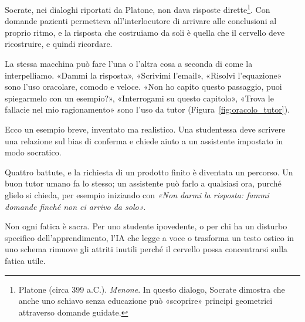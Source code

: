 Socrate, nei dialoghi riportati da Platone, non dava risposte dirette\footnote{Platone (circa 399 a.C.). \textit{Menone}. In questo dialogo, Socrate dimostra che anche uno schiavo senza educazione può «scoprire» principi geometrici attraverso domande guidate.}. Con domande pazienti permetteva all'interlocutore di arrivare alle conclusioni al proprio ritmo, e la risposta che costruiamo da soli è quella che il cervello deve ricostruire, e quindi ricordare.

La stessa macchina può fare l'una o l'altra cosa a seconda di come la interpelliamo. «Dammi la risposta», «Scrivimi l'email», «Risolvi l'equazione» sono l'uso oracolare, comodo e veloce. «Non ho capito questo passaggio, puoi spiegarmelo con un esempio?», «Interrogami su questo capitolo», «Trova le fallacie nel mio ragionamento» sono l'uso da tutor (Figura~\ref{fig:oracolo_tutor}).


Ecco un esempio breve, inventato ma realistico. Una studentessa deve scrivere una relazione sul bias di conferma e chiede aiuto a un assistente impostato in modo socratico.





\noindent Quattro battute, e la richiesta di un prodotto finito è diventata un percorso. Un buon tutor umano fa lo stesso; un assistente può farlo a qualsiasi ora, purché glielo si chieda, per esempio iniziando con \textit{«Non darmi la risposta: fammi domande finché non ci arrivo da solo»}.

Non ogni fatica è sacra. Per uno studente ipovedente, o per chi ha un disturbo specifico dell'apprendimento, l'IA che legge a voce o trasforma un testo ostico in uno schema rimuove gli attriti inutili perché il cervello possa concentrarsi sulla fatica utile.

